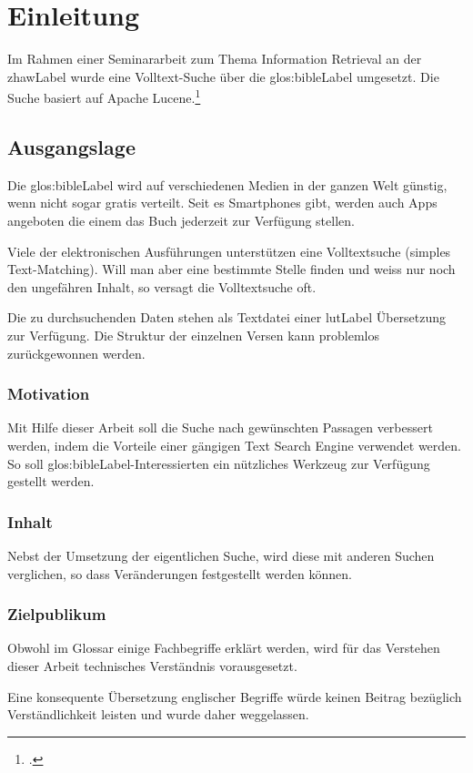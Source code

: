 \chapter{Einleitung}
Im Rahmen einer Seminararbeit zum Thema Information Retrieval an der \gls{zhawLabel} wurde eine Volltext-Suche über die \gls{glos:bibleLabel} umgesetzt. Die Suche basiert auf Apache Lucene.\footcite{Apache_Lucene_2016-05-07}

\section{Ausgangslage}
Die \gls{glos:bibleLabel} wird auf verschiedenen Medien in der ganzen Welt günstig, wenn nicht sogar gratis verteilt.
Seit es Smartphones gibt, werden auch Apps angeboten die einem das Buch jederzeit zur Verfügung stellen.

Viele der elektronischen Ausführungen unterstützen eine Volltextsuche (simples Text-Matching).
Will man aber eine bestimmte Stelle finden und weiss nur noch den ungefähren Inhalt, so versagt die Volltextsuche oft.

Die zu durchsuchenden Daten stehen als Textdatei einer \gls{lutLabel} Übersetzung zur Verfügung. Die Struktur der einzelnen Versen kann problemlos zurückgewonnen werden.

\subsection{Motivation}
Mit Hilfe dieser Arbeit soll die Suche nach gewünschten Passagen verbessert werden, indem die Vorteile einer gängigen Text Search Engine verwendet werden.
So soll \gls{glos:bibleLabel}-Interessierten ein nützliches Werkzeug zur Verfügung gestellt werden.

\subsection{Inhalt}
Nebst der Umsetzung der eigentlichen Suche, wird diese mit anderen Suchen verglichen, so dass Veränderungen festgestellt werden können.

\subsection{Zielpublikum}
Obwohl im Glossar einige Fachbegriffe erklärt werden, wird für das Verstehen dieser Arbeit technisches Verständnis vorausgesetzt.

Eine konsequente Übersetzung englischer Begriffe würde keinen Beitrag bezüglich Verständlichkeit leisten und wurde daher weggelassen.

